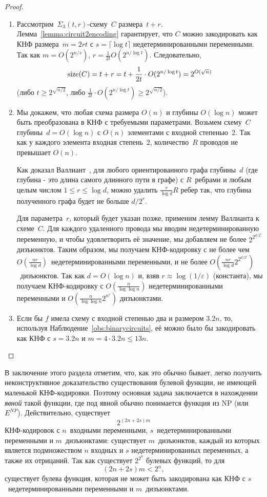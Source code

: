 \begin{proof}
	\begin{enumerate}
		\item Рассмотрим~$\Sigma_3(t,r)$-схему~$C$ размера~$t + r$. Лемма~\ref{lemma:circuit2encoding} гарантирует, что $C$ можно закодировать как КНФ размера~$m = 2rt$ с $s = \lceil \log t \rceil$ недетерминированными переменными. Так как $m=O(2^{n/s})$, $r = \frac{1}{2t}O(2^{n / \log t})$.
		Следовательно,
		\[\operatorname{size}(C) = t + r = t +  \frac{1}{2t}\cdot O(2^{n / \log t}) = 2^{O(\sqrt{n})}\]
		(либо $t \ge 2^{\sqrt{n/2}}$, либо $\frac{1}{2t}\cdot O(2^{n/\log t}) \ge 2^{\sqrt{n/2}}$).
		
		\item Мы докажем, что любая схема размера $O(n)$ и глубины $O(\log n)$ может быть преобразована в КНФ с требуемыми параметрами. 
		Возьмем схему~$C$ глубины~$d = O(\log n)$ с $O(n)$ элементами с входной степенью~$2$. Так как у каждого элемента входная степень~$2$, количество~$R$
		проводов не превышает $O(n)$.
		
		Как доказал Валлиант~\cite{DBLP:conf/mfcs/Valiant77},
		для любого ориентированного графа глубины~$d$ (где глубина - это длина самого длинного пути в графе) с $R$~ребрами и любым целым числом $1 \le r \le \log d$, можно удалить $\frac{r}{\log d}R$ ребер так, что глубина 
		полученного графа будет не больше $d/2^r$.
		
		Для параметра~$r$, который будет указан позже, 
		применим лемму Валлианта к схеме~$C$.
		Для каждого удаленного провода мы вводим 
		недетерминированную переменную,
		и чтобы удовлетворить её значение, 
		мы добавляем не более $2^{2^{d/2^r}}$ дизъюнктов.
		Таким образом, мы получаем КНФ-кодировку с не более чем $O(\frac{n r}{\log d})$~недетерминированными переменными,
		и не более $O(\frac{n r}{\log d} 2^{2^{d / 2^r}})$~дизъюнктов. Так как $d = O(\log n)$ и, взяв $r \approx \log (1 / \varepsilon)$ (константа), мы получаем КНФ-кодировку с $O(\frac{n}{\log \log n})$ недетерминированными переменными и $O(\frac{n}{\log \log n} 2^{n^\varepsilon})$ дизъюнктами.
		
		\item Если бы $f$ имела схему с входной степенью два и размером $3.2n$,
		то, используя Наблюдение~\ref{obs:binarycircuits}, 
		её можно было бы закодировать как КНФ с $s=3.2n$ и $m=4\cdot 3.2n 
		\le 13n$.
	\end{enumerate}
\end{proof}


В заключение этого раздела отметим, что, как это обычно бывает, легко получить
неконструктивное доказательство существования булевой функции, не имеющей маленькой КНФ-кодировки.
Поэтому основная задача заключается в нахождении \emph{явной}
такой функции, где под явной обычно понимается функция
из NP (или $E^{NP}$).
Действительно, существует
\[2^{(2n+2s)m}\]
КНФ-кодировок с $n$~входными переменными, $s$~недетерминированными переменными и $m$~дизъюнктами: существует $m$~дизъюнктов, каждый из которых является подмножеством $n$ входных и $s$ недетерминированных переменных, а также их отрицаний. Так как существует $2^{2^n}$ булевых
функций, то для 
\[(2n+2s)m < 2^n,\]
существует булева функция, которая не может быть закодирована как КНФ
с $s$~недетерминированными переменными и $m$~дизъюнктами.

